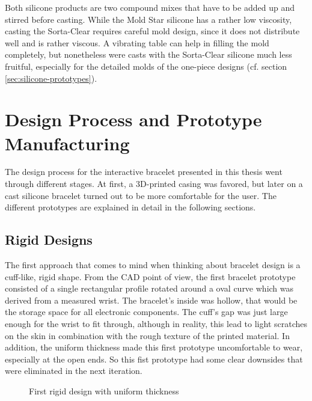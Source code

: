 Both silicone products are two compound mixes that have to be added up and stirred before casting. While the Mold Star silicone has a rather low viscosity, casting the Sorta-Clear requires careful mold design, since it does not distribute well and is rather viscous. A vibrating table can help in filling the mold completely, but nonetheless were casts with the Sorta-Clear silicone much less fruitful, especially for the detailed molds of the one-piece designs (cf. section \ref{sec:silicone-prototypes}).

\section{Design Process and Prototype Manufacturing}

The design process for the interactive bracelet presented in this thesis went through different stages. At first, a 3D-printed casing was favored, but later on a cast silicone bracelet turned out to be more comfortable for the user. The different prototypes are explained in detail in the following sections.

\subsection{Rigid Designs}

The first approach that comes to mind when thinking about bracelet design is a cuff-like, rigid shape. From the CAD point of view, the first bracelet prototype consisted of a single rectangular profile rotated around a oval curve which was derived from a measured wrist. The bracelet's inside was hollow, that would be the storage space for all electronic components. The cuff's gap was just large enough for the wrist to fit through, although in reality, this lead to light scratches on the skin in combination with the rough texture of the printed material. In addition, the uniform thickness made this first prototype uncomfortable to wear, especially at the open ends. So this fist prototype had some clear downsides that were eliminated in the next iteration.

\begin{figure}[bth]
	\myfloatalign
	 \quad
	\caption{First rigid design with uniform thickness}
\end{figure}

